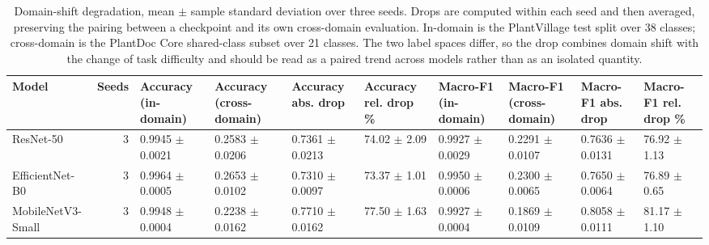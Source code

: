 \begin{table}[htbp]
\caption{Domain-shift degradation, mean $\pm$ sample standard deviation over three seeds. Drops are computed within each seed and then averaged, preserving the pairing between a checkpoint and its own cross-domain evaluation. In-domain is the PlantVillage test split over 38 classes; cross-domain is the PlantDoc Core shared-class subset over 21 classes. The two label spaces differ, so the drop combines domain shift with the change of task difficulty and should be read as a paired trend across models rather than as an isolated quantity.}
\label{tab:degradation}
\begin{tabular}{lrllllllll}
\toprule
Model & Seeds & Accuracy (in-domain) & Accuracy (cross-domain) & Accuracy abs. drop & Accuracy rel. drop \% & Macro-F1 (in-domain) & Macro-F1 (cross-domain) & Macro-F1 abs. drop & Macro-F1 rel. drop \% \\
\midrule
ResNet-50 & 3 & 0.9945 $\pm$ 0.0021 & 0.2583 $\pm$ 0.0206 & 0.7361 $\pm$ 0.0213 & 74.02 $\pm$ 2.09 & 0.9927 $\pm$ 0.0029 & 0.2291 $\pm$ 0.0107 & 0.7636 $\pm$ 0.0131 & 76.92 $\pm$ 1.13 \\
EfficientNet-B0 & 3 & 0.9964 $\pm$ 0.0005 & 0.2653 $\pm$ 0.0102 & 0.7310 $\pm$ 0.0097 & 73.37 $\pm$ 1.01 & 0.9950 $\pm$ 0.0006 & 0.2300 $\pm$ 0.0065 & 0.7650 $\pm$ 0.0064 & 76.89 $\pm$ 0.65 \\
MobileNetV3-Small & 3 & 0.9948 $\pm$ 0.0004 & 0.2238 $\pm$ 0.0162 & 0.7710 $\pm$ 0.0162 & 77.50 $\pm$ 1.63 & 0.9927 $\pm$ 0.0004 & 0.1869 $\pm$ 0.0109 & 0.8058 $\pm$ 0.0111 & 81.17 $\pm$ 1.10 \\
\bottomrule
\end{tabular}
\end{table}
